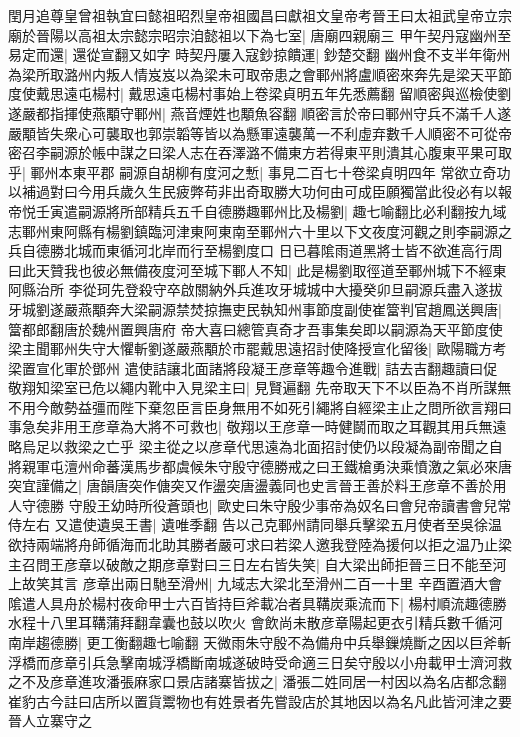 閏月追尊皇曾祖執宜曰懿祖昭烈皇帝祖國昌曰獻祖文皇帝考晉王曰太祖武皇帝立宗廟於晉陽以高祖太宗懿宗昭宗洎懿祖以下為七室|{
	唐廟四親廟三}
甲午契丹寇幽州至易定而還|{
	還從宣翻又如字}
時契丹屢入寇鈔掠饋運|{
	鈔楚交翻}
幽州食不支半年衛州為梁所取潞州内叛人情岌岌以為梁未可取帝患之會鄆州將盧順密來奔先是梁天平節度使戴思遠屯楊村|{
	戴思遠屯楊村事始上卷梁貞明五年先悉薦翻}
留順密與巡檢使劉遂嚴都指揮使燕顒守鄆州|{
	燕音煙姓也顒魚容翻}
順密言於帝曰鄆州守兵不滿千人遂嚴顒皆失衆心可襲取也郭崇韜等皆以為懸軍遠襲萬一不利虛弃數千人順密不可從帝密召李嗣源於帳中謀之曰梁人志在吞澤潞不備東方若得東平則潰其心腹東平果可取乎|{
	鄆州本東平郡}
嗣源自胡柳有度河之慙|{
	事見二百七十卷梁貞明四年}
常欲立奇功以補過對曰今用兵歲久生民疲弊苟非出奇取勝大功何由可成臣願獨當此役必有以報帝悦壬寅遣嗣源將所部精兵五千自德勝趣鄆州比及楊劉|{
	趣七喻翻比必利翻按九域志鄆州東阿縣有楊劉鎮臨河津東阿東南至鄆州六十里以下文夜度河觀之則李嗣源之兵自德勝北城而東循河北岸而行至楊劉度口}
日已暮隂雨道黑將士皆不欲進高行周曰此天贊我也彼必無備夜度河至城下鄆人不知|{
	此是楊劉取徑道至鄆州城下不經東阿縣治所}
李從珂先登殺守卒啟關納外兵進攻牙城城中大擾癸卯旦嗣源兵盡入遂拔牙城劉遂嚴燕顒奔大梁嗣源禁焚掠撫吏民執知州事節度副使崔簹判官趙鳳送興唐|{
	簹都郎翻唐於魏州置興唐府}
帝大喜曰總管真奇才吾事集矣即以嗣源為天平節度使梁主聞鄆州失守大懼斬劉遂嚴燕顒於市罷戴思遠招討使降授宣化留後|{
	歐陽職方考梁置宣化軍於鄧州}
遣使詰讓北面諸將段凝王彦章等趣令進戰|{
	詰去吉翻趣讀曰促}
敬翔知梁室已危以繩内靴中入見梁主曰|{
	見賢遍翻}
先帝取天下不以臣為不肖所謀無不用今敵勢益彊而陛下棄忽臣言臣身無用不如死引繩將自經梁主止之問所欲言翔曰事急矣非用王彦章為大將不可救也|{
	敬翔以王彦章一時健鬬而取之耳觀其用兵無遠略烏足以救梁之亡乎}
梁主從之以彦章代思遠為北面招討使仍以段凝為副帝聞之自將親軍屯澶州命蕃漢馬步都虞候朱守殷守德勝戒之曰王鐵槍勇決乘憤激之氣必來唐突宜謹備之|{
	唐韻唐突作傏突又作盪突唐盪義同也史言晉王善於料王彦章不善於用人守德勝}
守殷王幼時所役蒼頭也|{
	歐史曰朱守殷少事帝為奴名曰會兒帝讀書會兒常侍左右}
又遣使遺吳王書|{
	遺唯季翻}
告以己克鄆州請同舉兵擊梁五月使者至吳徐温欲持兩端將舟師循海而北助其勝者嚴可求曰若梁人邀我登陸為援何以拒之温乃止梁主召問王彦章以破敵之期彦章對曰三日左右皆失笑|{
	自大梁出師拒晉三日不能至河上故笑其言}
彦章出兩日馳至滑州|{
	九域志大梁北至滑州二百一十里}
辛酉置酒大會隂遣人具舟於楊村夜命甲士六百皆持巨斧載冶者具鞲炭乘流而下|{
	楊村順流趣德勝水程十八里耳鞲蒲拜翻韋囊也鼓以吹火}
會飲尚未散彦章陽起更衣引精兵數千循河南岸趨德勝|{
	更工衡翻趣七喻翻}
天微雨朱守殷不為備舟中兵舉鏁燒斷之因以巨斧斬浮橋而彦章引兵急擊南城浮橋斷南城遂破時受命適三日矣守殷以小舟載甲士濟河救之不及彦章進攻潘張麻家口景店諸寨皆拔之|{
	潘張二姓同居一村因以為名店都念翻崔豹古今註曰店所以置貨鬻物也有姓景者先嘗設店於其地因以為名凡此皆河津之要晉人立寨守之}
